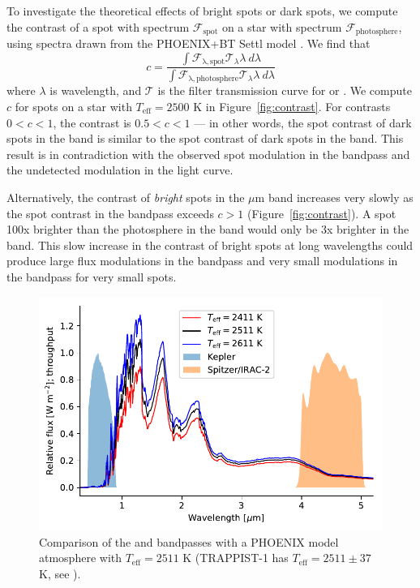 To investigate the theoretical effects of bright spots or dark spots, we compute the contrast of a spot with spectrum $\mathcal{F_\mathrm{spot}}$ on a star with spectrum $\mathcal{F_\mathrm{photosphere}}$, using spectra drawn from the  PHOENIX+BT Settl model \citep{Husser2013}. We find that
\begin{equation}
c = \frac{{\displaystyle \int} \mathcal{F_\mathrm{\lambda, spot}} \mathcal{T}_\lambda \lambda ~  d\lambda}{{\displaystyle \int} \mathcal{F_\mathrm{\lambda, photosphere}} \mathcal{T}_\lambda \lambda ~ d\lambda} \label{eqn:contrast}
\end{equation}
where $\lambda$ is wavelength, and $\mathcal{T}$ is the filter transmission curve for \kepler or \spitzer. We compute $c$ for spots on a star with $T_\mathrm{eff} = 2500$ K in Figure~\ref{fig:contrast}. For \kepler contrasts $0 < c < 1$, the \spitzer contrast is $0.5 < c < 1$ --- in other words, the spot contrast of dark spots in the \kepler band is similar to the spot contrast of dark spots in the \spitzer band. This result is in contradiction with the observed spot modulation in the \kepler bandpass and the undetected modulation in the \spitzer light curve.

Alternatively, the contrast of \textit{bright} spots in the  $\mu$m band increases very slowly as the spot contrast in the \kepler bandpass exceeds $c > 1$ (Figure~\ref{fig:contrast}). A spot 100x brighter than the photosphere in the \kepler band would only be 3x brighter in the \spitzer band. This slow increase in the contrast of bright spots at long wavelengths could produce large flux modulations in the \kepler bandpass and very small modulations in the \spitzer bandpass for very small spots. 

\begin{figure}
\begin{center}
\includegraphics[scale=0.6]{trappist1_bright/i_love_nirspec.pdf}
\end{center}
\caption{Comparison of the \spitzer and \kepler bandpasses with a PHOENIX model atmosphere with $T_\mathrm{eff} = 2511$ K (TRAPPIST-1 has $T_\mathrm{eff} = 2511 \pm 37$ K, see \citealt{Delrez2018}). \label{fig:bandpasses}}
\end{figure}


